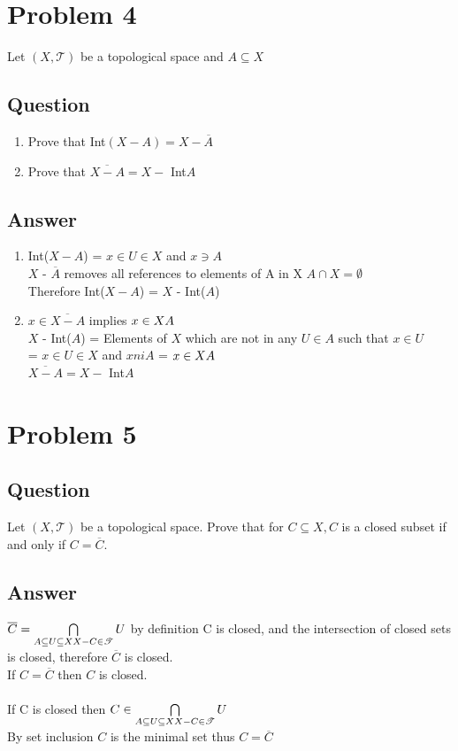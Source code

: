\documentclass{article}
\begin{document}
\section*{Problem 4}
Let \((X, \mathscr{T})\) be a topological space and \(A \subseteq X\)
\subsection*{Question}
\begin{enumerate}[label=\alph*]
\item Prove that Int\((X - A) = X - \overline{A}\)
\item Prove that \(\overline{X -A} = X -\) Int\(A\)
\end{enumerate}
\subsection*{Answer}
\begin{enumerate}[label=\alph*]
\item Int(\(X - A\)) = \(x \in U \in X\) and \(x \ni A\)
	\\\(X\) - \(\overline{A}\) removes all references to elements of A in X \(A \cap X = \emptyset\) 
	\\ Therefore Int(\(X - A\)) = \(X\) - Int(\(A\))
\item \(x \in \overline{X-A}\) implies \(x \in X\\A\)
	\\ \(X\) - Int(\(A\)) = Elements of \(X\) which are not in any \(U \in A\) such that \(x \in U\)
	\\                           = \(x \in U \in X\) and \(x ni A\)  = \(x \in X\\A\)
	\\ \(\overline{X -A} = X -\) Int\(A\)
\end{enumerate}
\section*{Problem 5}
\subsection*{Question}
Let \((X, \mathscr{T})\) be a topological space. Prove that for \(C \subseteq X, C\) is a closed subset if and only if \(C = \overline{C}\).
\subsection*{Answer}
\(\overline{C} = \bigcap\limits_{A \subseteq U \subseteq X \\ X - C \in \mathscr{T}} U \) by definition C is closed, and the intersection of closed sets is closed, therefore \(\overline{C}\) is closed.
\\If \(C = \overline{C}\) then \(C\) is closed.
\\ \\ If C is closed then \(C \in \bigcap\limits_{A \subseteq U \subseteq X \\ X - C \in \mathscr{T}} U\)
\\ By set inclusion \(C\) is the minimal set thus \(C = \overline{C}\)
\end{document}
